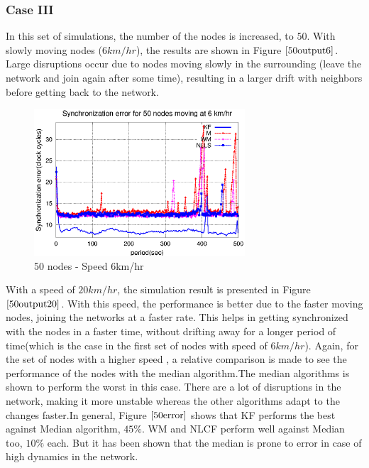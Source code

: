 \documentclass[a4paper,10pt]{report}
\begin{document}
\subsubsection{\textbf{Case III}}
In this set of simulations, the number of the nodes is increased, to
$50$. With slowly moving nodes ($6km/hr$), the results are shown in
Figure $\ref{50output6}$. Large disruptions occur due to nodes
moving slowly in the surrounding (leave the network and join again
after some time), resulting in a larger drift with neighbors before
getting back to the network. \newline
\begin{figure}
\centering
\includegraphics[width=0.7\textwidth]{50output-s6}
\caption{50 nodes - Speed 6km/hr} \label{50output6}
\end{figure}
With a speed of $20km/hr$, the simulation result is presented in
Figure $\ref{50output20}$. With this speed, the performance is
better due to the faster moving nodes, joining the networks at a
faster rate. This helps in getting synchronized with the nodes in a
faster time, without drifting away for a longer period of time(which
is the case in the first set of nodes with speed of $6km/hr$).
Again, for the set of nodes with a higher speed , a relative
comparison is made to see the performance of the nodes with the
median algorithm.\newline The median algorithms is shown to perform
the worst in this case. There are a lot of disruptions in the
network, making it more unstable whereas the other algorithms adapt
to the changes faster.\newline In general, Figure $\ref{50error}$
shows that KF performs the best against Median algorithm, $45\%$. WM
and NLCF perform well against Median too, $10\%$ each. But it has
been shown that the median is prone to error in case of high
dynamics in the network.
\end{document}

